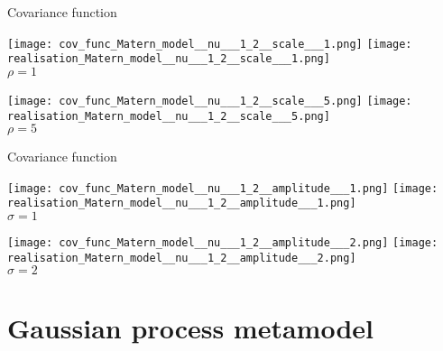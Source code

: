 \documentclass[9pt]{beamer}
\begin{document}
\begin{frame}[t]{Covariance function}

\begin{center}
\texttt{[image: cov\_func\_Matern\_model\_\_nu\_\_\_1\_2\_\_scale\_\_\_1.png]} 
\texttt{[image: realisation\_Matern\_model\_\_nu\_\_\_1\_2\_\_scale\_\_\_1.png]} \\

$\rho = 1$
\end{center}

\begin{center}
\texttt{[image: cov\_func\_Matern\_model\_\_nu\_\_\_1\_2\_\_scale\_\_\_5.png]} 
\texttt{[image: realisation\_Matern\_model\_\_nu\_\_\_1\_2\_\_scale\_\_\_5.png]} \\

$\rho = 5$

\end{center}

\end{frame}

\begin{frame}[t]{Covariance function}

\begin{center}
\texttt{[image: cov\_func\_Matern\_model\_\_nu\_\_\_1\_2\_\_amplitude\_\_\_1.png]} 
\texttt{[image: realisation\_Matern\_model\_\_nu\_\_\_1\_2\_\_amplitude\_\_\_1.png]} \\

$\sigma = 1$
\end{center}

\begin{center}
\texttt{[image: cov\_func\_Matern\_model\_\_nu\_\_\_1\_2\_\_amplitude\_\_\_2.png]} 
\texttt{[image: realisation\_Matern\_model\_\_nu\_\_\_1\_2\_\_amplitude\_\_\_2.png]} \\

$\sigma = 2$

\end{center}

\end{frame}


\section{Gaussian process metamodel}
\end{document}
